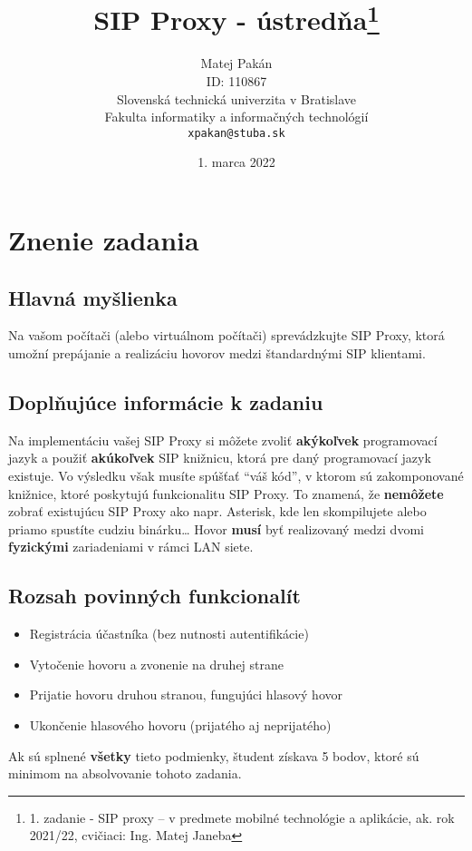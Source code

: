 \documentclass[10pt,oneside,slovak,a4paper]{article}
\title{SIP Proxy - ústredňa\thanks{1. zadanie - SIP proxy – v predmete mobilné technológie a aplikácie, ak. rok 2021/22, cvičiaci: 
Ing. Matej Janeba}}
\author{Matej Pakán\\[2pt]
	{\small ID: 110867}\\
	{\small Slovenská technická univerzita v Bratislave}\\
	{\small Fakulta informatiky a informačných technológií}\\
	{\small \texttt{xpakan@stuba.sk}}
	}
\date{\small 1. marca 2022}
\begin{document}
\maketitle
\newpage
\tableofcontents{\protect\newpage}

\section{Znenie zadania}

\subsection{Hlavná myšlienka}
Na vašom počítači (alebo virtuálnom počítači) sprevádzkujte SIP Proxy, ktorá 
umožní prepájanie a realizáciu hovorov medzi štandardnými SIP klientami.

\subsection{Doplňujúce informácie k zadaniu}
Na implementáciu vašej SIP Proxy si môžete zvoliť \textbf{akýkoľvek} programovací jazyk a použiť \textbf{akúkoľvek} SIP 
knižnicu, ktorá pre daný programovací jazyk existuje. Vo výsledku však musíte spúšťať “váš kód”, v 
ktorom sú zakomponované knižnice, ktoré poskytujú funkcionalitu SIP Proxy. To znamená, že \textbf{nemôžete}
zobrať existujúcu SIP Proxy ako napr. Asterisk, kde len skompilujete alebo priamo spustíte cudziu 
binárku… Hovor \textbf{musí} byť realizovaný medzi dvomi \textbf{fyzickými} zariadeniami v rámci LAN siete.

\subsection{Rozsah povinných funkcionalít}
\begin{itemize}
\item{Registrácia účastníka (bez nutnosti autentifikácie)}
\item{Vytočenie hovoru a zvonenie na druhej strane}
\item{Prijatie hovoru druhou stranou, fungujúci hlasový hovor}
\item{Ukončenie hlasového hovoru (prijatého aj neprijatého)}
\end{itemize}
Ak sú splnené \textbf{všetky} tieto podmienky, študent získava 5 bodov, ktoré sú minimom na absolvovanie 
tohoto zadania.
\end{document}

